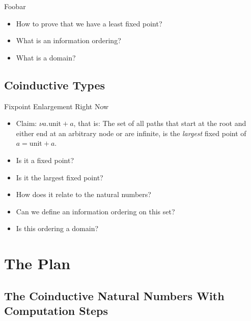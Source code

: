 \documentclass{beamer}
\begin{document}
\begin{frame}{Foobar}

 \begin{itemize}
  \item How to prove that we have a least fixed point?
  \item What is an information ordering?
  \item What is a domain?
 \end{itemize}

\end{frame}


\subsection{Coinductive Types}

\begin{frame}{Fixpoint Enlargement Right Now}

  \begin{itemize}
    \item Claim: $\nu a . \text{unit} + a$, that is: The set of all paths that start
          at the root and either end at an arbitrary node or are infinite, is
          the \emph{largest} fixed point of $a = \text{unit} + a$.
    \item Is it a fixed point?
    \item Is it the largest fixed point?
    \item How does it relate to the natural numbers?
    \item Can we define an information ordering on this set?
    \item Is this ordering a domain?
  \end{itemize}

\end{frame}


\section{The Plan}

\subsection{The Coinductive Natural Numbers With Computation Steps}
\end{document}
